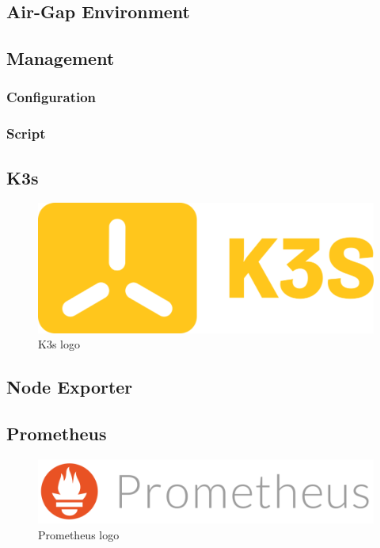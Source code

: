\subsection{Air-Gap Environment}
\label{subsec:implementation_dependencies_air_gap_environment}

\subsection{Management}
\label{subsec:implementation_dependencies_management}

\subsubsection{Configuration}
\label{subsec:implementation_dependencies_management_configuration}

\subsubsection{Script}
\label{subsec:implementation_dependencies_management_script}

\subsection{K3s}
\label{subsec:implementation_dependencies_k3s}

\begin{figure}
  \centering
  \includegraphics[width=.25\textwidth]{images/logos/k3s.png}
  \caption{K3s logo}
\end{figure}

\subsection{Node Exporter}
\label{subsec:implementation_dependencies_node_exporter}

\subsection{Prometheus}
\label{subsec:implementation_dependencies_prometheus}

\begin{figure}
  \centering
  \includegraphics[width=.25\textwidth]{images/logos/prometheus.png}
  \caption{Prometheus logo}
\end{figure}

